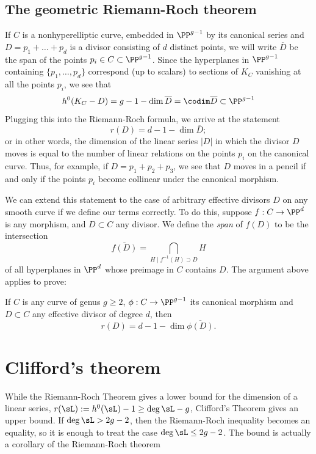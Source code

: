 \subsection{The geometric Riemann-Roch theorem}

If $C$ is a nonhyperelliptic curve, embedded in $\PP^{g-1}$ by its canonical series and  $D = p_1+\dots + p_d$ is a divisor consisting of $d$ distinct points, we will write $\overline D$ be the span of the points $p_i \in C \subset \PP^{g-1}$. Since the hyperplanes in $\PP^{g-1}$ containing $\{p_1,\dots,p_d\}$ correspond (up to scalars) to sections of $K_C$ vanishing at all the points $p_i$, we see that
$$
h^0(K_C-D) = g - 1 - \dim \overline D = \codim \overline D \subset \PP^{g-1}
$$
Plugging this into the Riemann-Roch formula, we arrive at the statement
$$
r(D) = d - 1 - \dim \overline D;
$$
or in other words, the dimension of the linear series $|D|$ in which the divisor $D$ moves is equal to the number of linear relations on the points $p_i$ on the canonical curve. Thus, for example, if $D = p_1+p_2+p_3$, we see that $D$ moves in a pencil if and only if the points $p_i$ become collinear under the canonical morphism.

We can extend this statement to the case of arbitrary effective divisors $D$ on any smooth curve if we define our terms correctly. To do this, suppose $f : C \to \PP^d$ is any morphism, and $D \subset C$ any divisor. We define the \emph{span} of  $f(D)$ to be the intersection
$$
\overline{f(D)} = \bigcap_{H \mid f^{-1}(H)\supset D} H 
$$
of all hyperplanes in $\PP^d$ whose preimage in $C$ contains $D$. The argument above applies to prove:

\begin{theorem}\label{geometric RR}
If $C$ is any curve of genus $g \geq 2$,  $\phi : C \to \PP^{g-1}$ its canonical morphism and $D \subset C$ any effective divisor of degree $d$, then
$$
r(D) = d - 1 - \dim \overline{\phi(D)}.
$$
\end{theorem}

\section{Clifford's theorem}

While the Riemann-Roch Theorem gives a lower bound for the dimension of a linear series, $r(\sL) := h^0(\sL)-1 \geq \deg \sL -g$, Clifford's Theorem
gives an upper bound. If $\deg \sL>2g-2$, then the Riemann-Roch inequality becomes an equality, so it is enough to treat the case $\deg \sL \leq 2g-2$. The bound is actually a corollary of the Riemann-Roch theorem 

